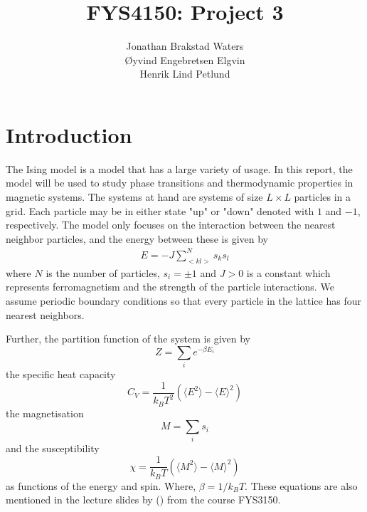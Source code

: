 \documentclass[12pt,english,a4paper]{article}
\title{FYS4150: Project 3}
\author{Jonathan Brakstad Waters\\Øyvind Engebretsen Elgvin\\Henrik Lind Petlund}
\begin{document}
\begin{titlepage}
\maketitle
\begin{abstract}
    
\end{abstract}

\end{titlepage}

\section{Introduction} \label{introduction}

The Ising model is a model that has a large variety of usage. In this report, the model will be used to study phase transitions and thermodynamic properties in magnetic systems. The systems at hand are systems of size $L\times L$ particles in a grid. Each particle may be in either state "up" or "down" denoted with $1$ and $-1$, respectively. The model only focuses on the interaction between the nearest neighbor particles, and the energy between these is given by
\begin{align}
    E = -J \sum_{<kl>}^N s_ks_l 
\end{align}
where $N$ is the number of particles, $s_i=\pm 1$ and $J>0$ is a constant which represents ferromagnetism and the strength of the particle interactions. We assume periodic boundary conditions so that every particle in the lattice has four nearest neighbors. 

Further, the partition function of the system is given by
\begin{equation}
Z=\sum_i e^{-\beta E_i} \label{eq:partition}
\end{equation}
the specific heat capacity
\begin{equation}
C_V=\frac{1}{k_B T^2}\left(\langle E^2\rangle-\langle E\rangle^2\right)
\end{equation}
the magnetisation
\begin{equation}
M=\sum_is_i
\end{equation}
and the susceptibility
\begin{equation}
\chi= \frac{1}{k_B T}\left(\langle M^2\rangle-\langle M\rangle^2\right)
\end{equation}
as functions of the energy and spin. Where, $\beta =1/k_B T$. These equations are also mentioned in the lecture slides by (\cite{LectureIsing}) from the course FYS3150.
\end{document}
